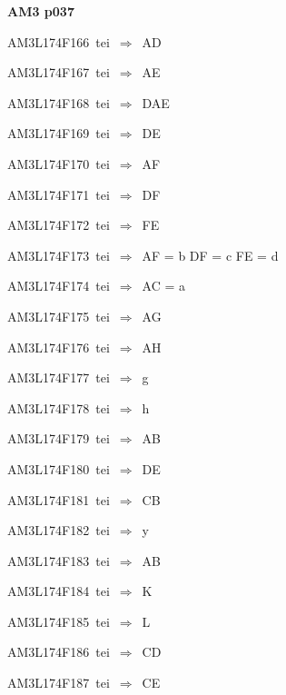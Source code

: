 \par\vfill\eject
{\bf\hfill AM3 p037\hfill\hbox{}}\par\bigskip
{\sixrm AM3L174F166\ {\sixit tei}\ }$\Rightarrow$\ AD\par\smallskip
{\sixrm AM3L174F167\ {\sixit tei}\ }$\Rightarrow$\ AE\par\smallskip
{\sixrm AM3L174F168\ {\sixit tei}\ }$\Rightarrow$\ DAE\par\smallskip
{\sixrm AM3L174F169\ {\sixit tei}\ }$\Rightarrow$\ DE\par\smallskip
{\sixrm AM3L174F170\ {\sixit tei}\ }$\Rightarrow$\ AF\par\smallskip
{\sixrm AM3L174F171\ {\sixit tei}\ }$\Rightarrow$\ DF\par\smallskip
{\sixrm AM3L174F172\ {\sixit tei}\ }$\Rightarrow$\ FE\par\smallskip
{\sixrm AM3L174F173\ {\sixit tei}\ }$\Rightarrow$\ AF = {\tenit b}  DF = {\tenit c} 
FE = {\tenit d}\par\smallskip
{\sixrm AM3L174F174\ {\sixit tei}\ }$\Rightarrow$\ AC = {\tenit a}\par\smallskip
{\sixrm AM3L174F175\ {\sixit tei}\ }$\Rightarrow$\ AG\par\smallskip
{\sixrm AM3L174F176\ {\sixit tei}\ }$\Rightarrow$\ AH\par\smallskip
{\sixrm AM3L174F177\ {\sixit tei}\ }$\Rightarrow$\ {\tenit g}\par\smallskip
{\sixrm AM3L174F178\ {\sixit tei}\ }$\Rightarrow$\ {\tenit h}\par\smallskip
{\sixrm AM3L174F179\ {\sixit tei}\ }$\Rightarrow$\ AB\par\smallskip
{\sixrm AM3L174F180\ {\sixit tei}\ }$\Rightarrow$\ DE\par\smallskip
{\sixrm AM3L174F181\ {\sixit tei}\ }$\Rightarrow$\ CB\par\smallskip
{\sixrm AM3L174F182\ {\sixit tei}\ }$\Rightarrow$\ {\tenit y}\par\smallskip
{\sixrm AM3L174F183\ {\sixit tei}\ }$\Rightarrow$\ AB\par\smallskip
{\sixrm AM3L174F184\ {\sixit tei}\ }$\Rightarrow$\ K\par\smallskip
{\sixrm AM3L174F185\ {\sixit tei}\ }$\Rightarrow$\ L\par\smallskip
{\sixrm AM3L174F186\ {\sixit tei}\ }$\Rightarrow$\ CD\par\smallskip
{\sixrm AM3L174F187\ {\sixit tei}\ }$\Rightarrow$\ CE\par\smallskip
